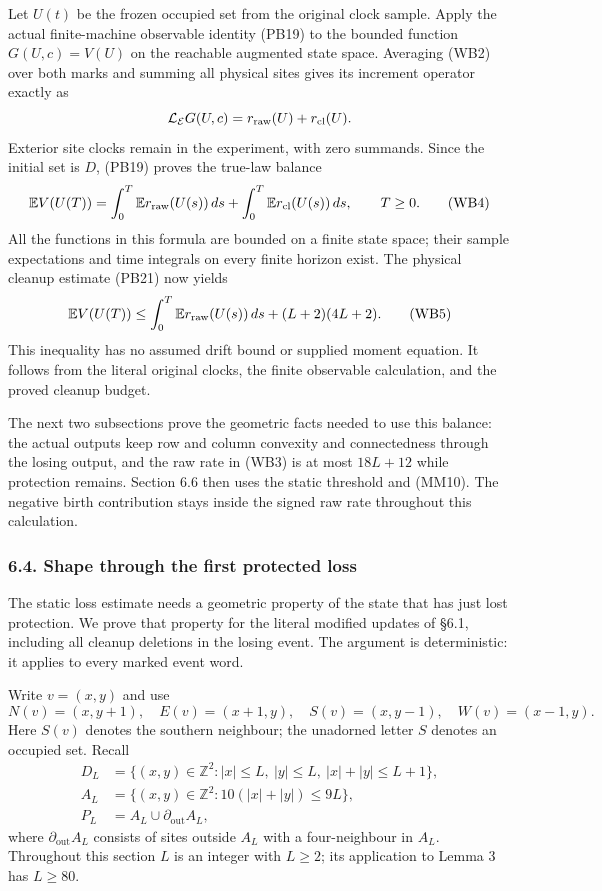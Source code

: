 \documentclass[
  11pt,
  a4paper,
]{article}
\begin{document}
Let \(U(t)\) be the frozen occupied set from the original clock sample.
Apply the actual finite-machine observable identity (PB19) to the
bounded function \(G(U,c)=V(U)\) on the reachable augmented state space.
Averaging (WB2) over both marks and summing all physical sites gives its
increment operator exactly as \[
\mathcal L_{\mathcal E}G(U,c)=r_{\rm raw}(U)+r_{\rm cl}(U).
\] Exterior site clocks remain in the experiment, with zero summands.
Since the initial set is \(D\), (PB19) proves the true-law balance \[
\mathbb E V(U(T))
=\int_0^T\mathbb E r_{\rm raw}(U(s))\,ds
+\int_0^T\mathbb E r_{\rm cl}(U(s))\,ds,
\qquad T\geq0.
\tag{WB4}
\] All the functions in this formula are bounded on a finite state
space; their sample expectations and time integrals on every finite
horizon exist. The physical cleanup estimate (PB21) now yields \[
\mathbb E V(U(T))
\leq\int_0^T\mathbb E r_{\rm raw}(U(s))\,ds
+(L+2)(4L+2).
\tag{WB5}
\] This inequality has no assumed drift bound or supplied moment
equation. It follows from the literal original clocks, the finite
observable calculation, and the proved cleanup budget.

The next two subsections prove the geometric facts needed to use this
balance: the actual outputs keep row and column convexity and
connectedness through the losing output, and the raw rate in (WB3) is at
most \(18L+12\) while protection remains. Section 6.6 then uses the
static threshold and (MM10). The negative birth contribution stays
inside the signed raw rate throughout this calculation.

\subsubsection{6.4. Shape through the first protected
loss}\label{shape-through-the-first-protected-loss}

The static loss estimate needs a geometric property of the state that
has just lost protection. We prove that property for the literal
modified updates of §6.1, including all cleanup deletions in the losing
event. The argument is deterministic: it applies to every marked event
word.

Write \(v=(x,y)\) and use \[
N(v)=(x,y+1),\quad E(v)=(x+1,y),\quad
S(v)=(x,y-1),\quad W(v)=(x-1,y).
\] Here \(S(v)\) denotes the southern neighbour; the unadorned letter
\(S\) denotes an occupied set. Recall \[
\begin{aligned}
D_L&=\{(x,y)\in\mathbb Z^2:|x|\le L,\ |y|\le L,\ |x|+|y|\le L+1\},\\
A_L&=\{(x,y)\in\mathbb Z^2:10(|x|+|y|)\le9L\},\\
P_L&=A_L\cup\partial_{\mathrm{out}}A_L,
\end{aligned}
\] where \(\partial_{\mathrm{out}}A_L\) consists of sites outside
\(A_L\) with a four-neighbour in \(A_L\). Throughout this section \(L\)
is an integer with \(L\ge2\); its application to Lemma 3 has \(L\ge80\).
\end{document}
